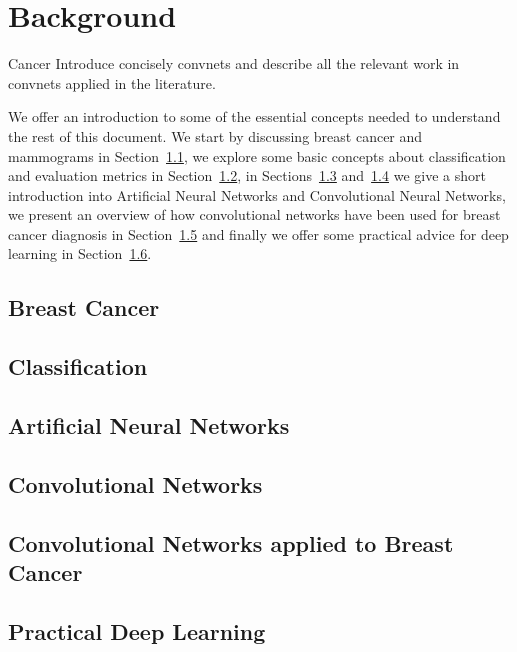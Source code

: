 \chapter{Background}
\label{ch:Background}

Cancer
Introduce concisely convnets and describe all the relevant work in convnets applied in the literature.

We offer an introduction to some of the essential concepts needed to understand the rest of this document. We start by discussing breast cancer and mammograms in Section~\ref{sec:BreastCancer}, we explore some basic concepts about classification and evaluation metrics in Section~\ref{sec:Classification}, in Sections~\ref{sec:ANNs} and~\ref{sec:ConvNets} we give a short introduction into Artificial Neural Networks and Convolutional Neural Networks, we present an overview of how convolutional networks have been used for breast cancer diagnosis in Section~\ref{sec:BreastCancerConvNets} and finally we offer some practical advice for deep learning in Section~\ref{sec:PracticalDL}.

\section{Breast Cancer}
\label{sec:BreastCancer}


\section{Classification}
\label{sec:Classification}


\section{Artificial Neural Networks}
\label{sec:ANNs}


\section{Convolutional Networks}
\label{sec:ConvNets}


\section{Convolutional Networks applied to Breast Cancer}
\label{sec:BreastCancerConvNets}


\section{Practical Deep Learning}
\label{sec:PracticalDL}

